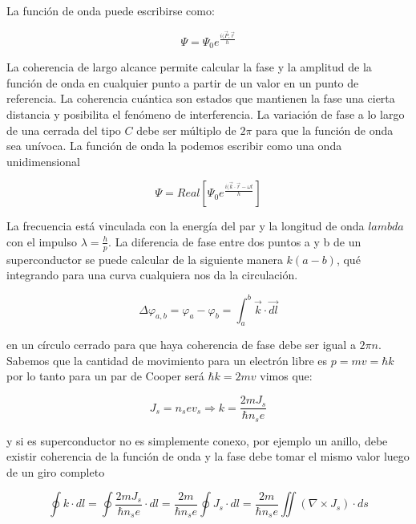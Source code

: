 La función de onda puede escribirse como:

\begin{equation}
	\Psi=\Psi_{0}e^{\frac{i(\vec{P},\vec{r}}{h}}
\end{equation}

La coherencia de largo alcance permite calcular la fase y la amplitud de la función de onda en cualquier punto a partir de un valor en un punto de referencia. La coherencia cuántica son estados que mantienen la fase una cierta distancia y posibilita el fenómeno de interferencia. La variación de fase a lo largo de una cerrada del tipo $C$ debe ser múltiplo de $2\pi$ para que la función de onda sea unívoca. La función de onda la podemos escribir como una onda unidimensional

\begin{equation}
	\Psi =  Real \left[ \Psi_{0}e^{\frac{i(\vec{k}\cdot \vec{r}-\omega t}{h}}\right] 
\end{equation}


La frecuencia está vinculada con la energía del par y la longitud de onda $lambda$ con el impulso $\lambda= \frac{h}{p}$. La diferencia de fase entre dos puntos a y b de un superconductor se puede calcular de la siguiente manera $k(a-b)$, qué integrando para una curva cualquiera nos da la circulación.

\begin{equation}
	\Delta\varphi_{a,b}=\varphi_{a}-\varphi_{b}=\int_{a}^{b}\overrightarrow{k}\cdot \overrightarrow{dl} 
\end{equation}

en un círculo cerrado para que haya coherencia de fase debe ser igual a $2\pi n$. Sabemos que la cantidad de movimiento para un electrón libre es $p=mv=\hbar k$ por lo tanto para un par de Cooper será $\hbar k = 2mv$ vimos que:

\begin{equation}
	J_{s}=n_{s}ev_{s} \Rightarrow k= \frac{2mJ_{s}}{\hbar n_{s} e}
\end{equation}

y si es superconductor no es simplemente conexo, por ejemplo un anillo, debe existir coherencia de la función de onda y la fase debe tomar el mismo valor luego de un giro completo

\begin{equation}
	\oint k \cdot dl= \oint \frac{2mJ_{s}}{\hbar n_{s} e} \cdot dl = \frac{2m}{\hbar n_{s} e} \oint J_{s} \cdot dl = \frac{2m}{\hbar n_{s} e} \iint(\nabla \times J_{s}) \cdot ds
\end{equation}

